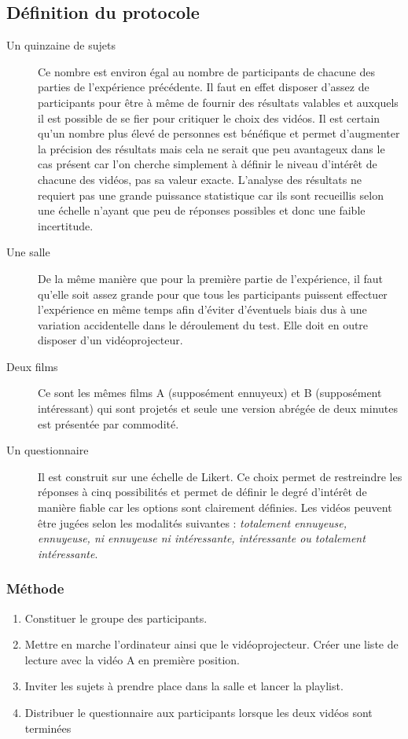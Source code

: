 \documentclass[12pt,fleqn,oneside,french,openany]{book} %
\begin{document}
\subsection{Définition du protocole} \label{ssec:defProto1.2}
\begin{description}
	\item[Un quinzaine de sujets] Ce nombre est environ égal au nombre de participants de chacune des parties de l'expérience précédente. Il faut en effet disposer d'assez de participants pour être à même de fournir des résultats valables et auxquels il est possible de se fier pour critiquer le choix des vidéos. Il est certain qu'un nombre plus élevé de personnes est bénéfique et permet d'augmenter la précision des résultats mais cela ne serait que peu avantageux dans le cas présent car l'on cherche simplement à définir le niveau d'intérêt de chacune des vidéos, pas sa valeur exacte. L'analyse des résultats ne requiert pas une grande puissance statistique car ils sont recueillis selon une échelle n'ayant que peu de réponses possibles et donc une faible incertitude.
	\item[Une salle] De la même manière que pour la première partie de l'expérience, il faut qu'elle soit assez grande pour que tous les participants puissent effectuer l'expérience en même temps afin d'éviter d'éventuels biais dus à une variation accidentelle dans le déroulement du test. Elle doit en outre disposer d'un vidéoprojecteur.
	\item[Deux films] Ce sont les mêmes films A (supposément ennuyeux) et B (supposément intéressant) qui sont projetés et seule une version abrégée de deux minutes est présentée par commodité.
	\item[Un questionnaire] Il est construit sur une échelle de Likert. Ce choix permet de restreindre les réponses à cinq possibilités et permet de définir le degré d'intérêt de manière fiable car les options sont clairement définies. Les vidéos peuvent être jugées selon les modalités suivantes : \emph{totalement ennuyeuse, ennuyeuse, ni ennuyeuse ni intéressante, intéressante ou totalement intéressante}.
\end{description}

\subsubsection{Méthode} \label{sssec:methode1.2}
\begin{enumerate}
	\item Constituer le groupe des participants.
	\item Mettre en marche l'ordinateur ainsi que le vidéoprojecteur. Créer une liste de lecture avec la vidéo A en première position.
	\item Inviter les sujets à prendre place dans la salle et lancer la playlist.
	\item Distribuer le questionnaire aux participants lorsque les deux vidéos sont terminées
\end{enumerate}
\end{document}

